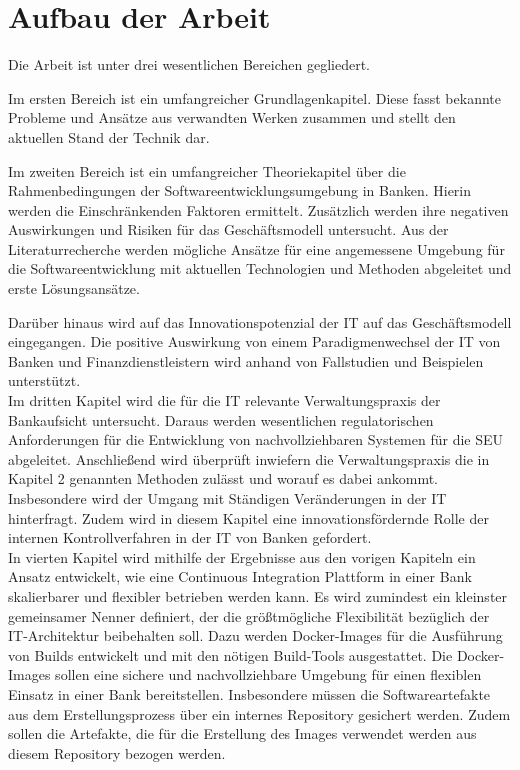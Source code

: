 \section{Aufbau der Arbeit}
\label{sec:intro:structure}
Die Arbeit ist unter drei wesentlichen Bereichen gegliedert. 

Im ersten Bereich ist ein umfangreicher Grundlagenkapitel. Diese fasst bekannte Probleme und Ansätze aus verwandten Werken zusammen und stellt den aktuellen Stand der Technik dar. 

Im zweiten Bereich ist ein umfangreicher Theoriekapitel über die Rahmenbedingungen der Softwareentwicklungsumgebung in Banken. Hierin werden die Einschränkenden Faktoren ermittelt. Zusätzlich werden ihre negativen Auswirkungen und Risiken für das Geschäftsmodell untersucht. Aus der Literaturrecherche werden mögliche Ansätze für eine angemessene Umgebung für die Softwareentwicklung mit aktuellen Technologien und Methoden abgeleitet und erste Lösungsansätze. 

Darüber hinaus wird auf das Innovationspotenzial der IT auf das Geschäftsmodell eingegangen. Die positive Auswirkung von einem Paradigmenwechsel der IT von Banken und Finanzdienstleistern wird anhand von Fallstudien und Beispielen unterstützt.
\medskip
\\
Im dritten Kapitel wird die für die IT relevante Verwaltungspraxis der Bankaufsicht untersucht. Daraus werden wesentlichen regulatorischen Anforderungen für die Entwicklung von nachvollziehbaren Systemen für die \ac{SEU} abgeleitet. Anschließend wird überprüft inwiefern die Verwaltungspraxis die in Kapitel 2 genannten Methoden zulässt und worauf es dabei ankommt. Insbesondere wird der Umgang mit Ständigen Veränderungen in der IT hinterfragt. Zudem wird in diesem Kapitel eine innovationsfördernde Rolle der internen Kontrollverfahren in der IT von Banken gefordert.
\medskip
\\
In vierten Kapitel wird mithilfe der Ergebnisse aus den vorigen Kapiteln ein Ansatz entwickelt, wie eine Continuous Integration Plattform in einer Bank skalierbarer und flexibler betrieben werden kann. Es wird zumindest ein kleinster gemeinsamer Nenner definiert, der die größtmögliche Flexibilität bezüglich der IT-Architektur beibehalten soll. Dazu werden Docker-Images für die Ausführung von Builds entwickelt und mit den nötigen Build-Tools ausgestattet. Die Docker-Images sollen eine sichere und nachvollziehbare Umgebung für einen flexiblen Einsatz in einer Bank bereitstellen. Insbesondere müssen die Softwareartefakte aus dem Erstellungsprozess über ein internes Repository gesichert werden. Zudem sollen die Artefakte, die für die Erstellung des Images verwendet werden aus diesem Repository bezogen werden. 